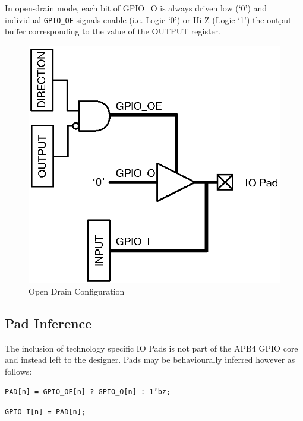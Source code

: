 In open-drain mode, each bit of GPIO\_O is always driven low (`0') and individual \texttt{GPIO\_OE} signals enable (i.e. Logic `0') or Hi-Z (Logic `1') the output buffer corresponding to the value of the OUTPUT register.

\begin{figure}[tbh]
	\centering
	\includegraphics{assets/img/apb4-gpio-od}
	\caption{Open Drain Configuration}
	\label{fig:apb4-gpio-od}
\end{figure}

\subsection{Pad Inference}\label{pad-inference}

The inclusion of technology specific IO Pads is not part of the APB4
GPIO core and instead left to the designer. Pads may be behaviourally
inferred however as follows:

\texttt{PAD[n] = GPIO\_OE[n] ? GPIO\_O[n] : 1'bz;}

\texttt{GPIO\_I[n] = PAD[n];}
